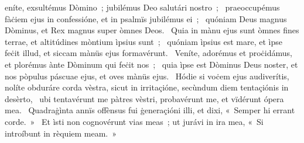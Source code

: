 \psalmChapterWithInscription{}
{ }
{%
eníte, exsultémus Dòmino~; jubilémus Deo salutári nostro~; 
~praeoccupémus fàċiem ejus in confessióne, et in psalmïs jubilémus ei~; 
~quóniam Deus magnus Dòminus, et Rex magnus super òmnes Deos. 
~Quia in mànu ejus sunt òmnes fines terrae, et altitúdines mòntium ìpsius sunt~; 
~quóniam ìpsius est mare, et ìpse feċit illud, et siccam mànüs ejus formavérunt. 
~Veníte, adorémus et proċidámus, et plorémus ànte Dòminum qui feċit nos~; 
~quia ìpse est Dòminus Deus noster, et nos pòpulus páscuae ejus, et oves mànüs ejus. 
~Hódie si voċem ejus audiverítis, nolíte obduráre corda vèstra, sicut in irritaçióne, secùndum diem tentaçiónis in desèrto, 
~ubi tentavérunt me pàtres vèstri, probavérunt me, et vïdérunt ópera mea. 
~Quadraġìnta annïs offènsus fui ġeneraçióni illi, et dixi, «~Semper hi errant corde.~»
~Et ìsti non cognovérunt vias meas~; ut jurávi in ira mea, «~Si introíbunt in rèquiem meam.~»
}
